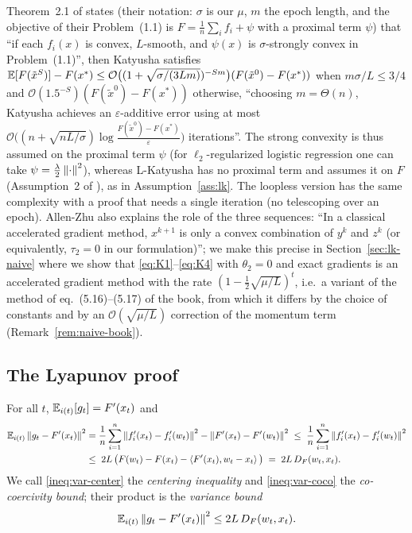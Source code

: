\begin{remark}
Theorem~2.1 of \cite{allenzhu2018katyusha} states (their notation: $\sigma$ is our $\mu$, $m$ the epoch length, and the objective of their Problem~(1.1) is $F=\frac1n\sum_if_i+\psi$ with a proximal term $\psi$) that ``if each $f_i(x)$ is convex, $L$-smooth, and $\psi(x)$ is $\sigma$-strongly convex in Problem~(1.1)'', then Katyusha satisfies $\mathbb{E}[F(\tilde x^S)]-F(x^\ast)\le\mathcal O\big((1+\sqrt{\sigma/(3Lm)})^{-Sm}\big)(F(\tilde x^0)-F(x^\ast))$ when $m\sigma/L\le 3/4$ and $\mathcal O(1.5^{-S})(F(\tilde x^0)-F(x^\ast))$ otherwise, ``choosing $m=\Theta(n)$, Katyusha achieves an $\varepsilon$-additive error using at most $\mathcal O\big((n+\sqrt{nL/\sigma})\log\frac{F(\tilde x^0)-F(x^\ast)}{\varepsilon}\big)$ iterations''. The strong convexity is thus assumed on the proximal term $\psi$ (for $\ell_2$-regularized logistic regression one can take $\psi=\frac\lambda2\left\|\cdot\right\|^2$), whereas L-Katyusha has no proximal term and assumes it on $F$ (Assumption~2 of \cite{kovalev2020dont}), as in Assumption~\ref{ass:lk}. The loopless version has the same complexity with a proof that needs a single iteration (no telescoping over an epoch). Allen-Zhu also explains the role of the three sequences: ``In a classical accelerated gradient method, $x^{k+1}$ is only a convex combination of $y^k$ and $z^k$ (or equivalently, $\tau_2=0$ in our formulation)''; we make this precise in Section~\ref{sec:lk-naive} where we show that \eqref{eq:K1}--\eqref{eq:K4} with $\theta_2=0$ and exact gradients is an accelerated gradient method with the rate $(1-\frac12\sqrt{\mu/L})^t$, i.e.\ a variant of the method of eq.~(5.16)--(5.17) of the book, from which it differs by the choice of constants and by an $\mathcal O(\sqrt{\mu/L})$ correction of the momentum term (Remark~\ref{rem:naive-book}).
\end{remark}

\subsection{The Lyapunov proof}
\label{sec:lk-proof}

\begin{lemma}\label{lem:L1}
For all $t$, $\mathbb{E}_{i(t)}[g_t]=F'(x_t)$ and
\begin{align}
\mathbb{E}_{i(t)}\left\|g_t-F'(x_t)\right\|^2 &= \frac1n\sum_{i=1}^n\left\|f'_i(x_t)-f'_i(w_t)\right\|^2-\left\|F'(x_t)-F'(w_t)\right\|^2
\;\le\;\frac1n\sum_{i=1}^n\left\|f'_i(x_t)-f'_i(w_t)\right\|^2 \label{ineq:var-center}\\
&\le\;2L\,\big(F(w_t)-F(x_t)-\left\langle F'(x_t), w_t-x_t \right\rangle\big)\;=\;2L\,D_F(w_t,x_t). \label{ineq:var-coco}
\end{align}
We call \eqref{ineq:var-center} the \emph{centering inequality} and \eqref{ineq:var-coco} the \emph{co-coercivity bound}; their product is the \emph{variance bound}
\begin{equation}\label{ineq:var}
\mathbb{E}_{i(t)}\left\|g_t-F'(x_t)\right\|^2\le 2L\,D_F(w_t,x_t).
\end{equation}
\end{lemma}

